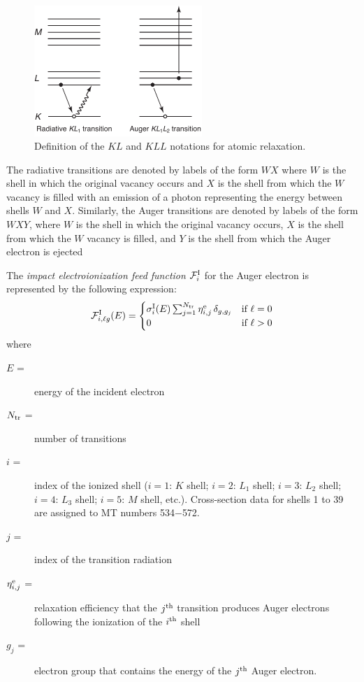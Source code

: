 \begin{figure}[h!]
\centering
\includegraphics[keepaspectratio, width=2.5in, angle=0]{figs/electr_relaxation}
\caption[Radiative and Auger atomic relaxation] {Definition of the
$KL$ and $KLL$ notations for atomic relaxation.}
\label{electr-fig5}
\end{figure}

The radiative transitions are denoted by labels of the form $WX$ where $W$ is
the shell in which the original vacancy occurs and $X$ is the shell from which
the $W$ vacancy is filled with an emission of a photon representing the energy
between shells $W$ and $X$. Similarly, the Auger transitions are denoted by
labels of the form $WXY$, where $W$ is the shell in which the original vacancy
occurs, $X$ is the shell from which the $W$ vacancy is filled, and $Y$ is the
shell from which the Auger electron is ejected

The {\sl impact electroionization feed function} ${\cal F}_i^{\rm I}$
 for the Auger electron is represented by
the following expression:
  \begin{equation}
    {\cal F}^{\rm I}_{i,\ell g}(E) =  \begin{cases}
    \sigma^{\rm I}_i(E) \sum_{j=1}^{N_{\rm tr}}
    \eta_{i,j}^{\rm e} \, \delta_{g,g_j} & \text{if $\ell=0$} \\
    0 & \text{if $\ell>0$} \end{cases}
  \label{elr_eq25}
  \end{equation}
\noindent where
\begin{description}
\item [$E$ =] energy of the incident electron
\item [$N_{\rm tr}$ =] number of transitions
\item [$i$ =] index of the ionized shell ($i=1$: $K$ shell; $i=2$: $L_1$
shell; $i=3$: $L_2$ shell; $i=4$: $L_3$ shell; $i=5$: $M$ shell, etc.).
Cross-section data for shells 1 to 39 are assigned to MT numbers 534$-$572.
\item [$j$ =] index of the transition radiation
\item [$\eta_{i,j}^{\rm e}$ =] relaxation efficiency that the $j^{\rm th}$
transition produces Auger electrons following the ionization of the
$i^{\rm th}$ shell
\item [$g_j$ =] electron group that contains the energy of the
$j^{\rm th}$ Auger electron.
\end{description}

